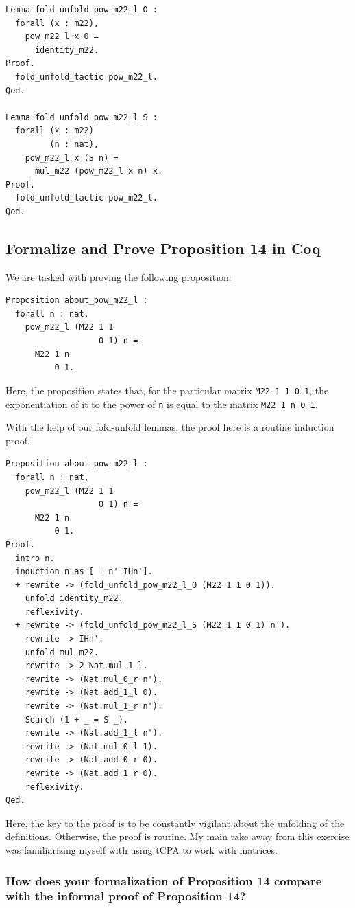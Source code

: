 \documentclass{article}
\begin{document}
\begin{lstlisting}
Lemma fold_unfold_pow_m22_l_O :
  forall (x : m22),
    pow_m22_l x 0 =
      identity_m22.
Proof.
  fold_unfold_tactic pow_m22_l.
Qed.

Lemma fold_unfold_pow_m22_l_S :
  forall (x : m22)
         (n : nat),
    pow_m22_l x (S n) =
      mul_m22 (pow_m22_l x n) x.
Proof.
  fold_unfold_tactic pow_m22_l.
Qed.
\end{lstlisting}

\subsection{Formalize and Prove Proposition 14 in Coq}
We are tasked with proving the following proposition:

\begin{lstlisting}
Proposition about_pow_m22_l :
  forall n : nat,
    pow_m22_l (M22 1 1
                   0 1) n =
      M22 1 n
          0 1.
\end{lstlisting}

Here, the proposition states that, for the particular matrix \texttt{M22 1 1 0 1}, the exponentiation of it to the power of \texttt{n} is equal to the matrix \texttt{M22 1 n 0 1}.

With the help of our fold-unfold lemmas, the proof here is a routine induction proof. 

\begin{lstlisting}
Proposition about_pow_m22_l :
  forall n : nat,
    pow_m22_l (M22 1 1
                   0 1) n =
      M22 1 n
          0 1.
Proof. 
  intro n.
  induction n as [ | n' IHn'].
  + rewrite -> (fold_unfold_pow_m22_l_O (M22 1 1 0 1)).
    unfold identity_m22.
    reflexivity.
  + rewrite -> (fold_unfold_pow_m22_l_S (M22 1 1 0 1) n').
    rewrite -> IHn'.
    unfold mul_m22.
    rewrite -> 2 Nat.mul_1_l.
    rewrite -> (Nat.mul_0_r n').
    rewrite -> (Nat.add_1_l 0).
    rewrite -> (Nat.mul_1_r n').
    Search (1 + _ = S _).
    rewrite -> (Nat.add_1_l n').
    rewrite -> (Nat.mul_0_l 1).
    rewrite -> (Nat.add_0_r 0).
    rewrite -> (Nat.add_1_r 0).
    reflexivity.
Qed.    
\end{lstlisting}

Here, the key to the proof is to be constantly vigilant about the unfolding of the definitions. Otherwise, the proof is routine. My main take away from this exercise was familiarizing myself with using tCPA to work with matrices. 

\subsubsection{How does your formalization of Proposition 14 compare with the informal proof of Proposition 14?}
\end{document}
